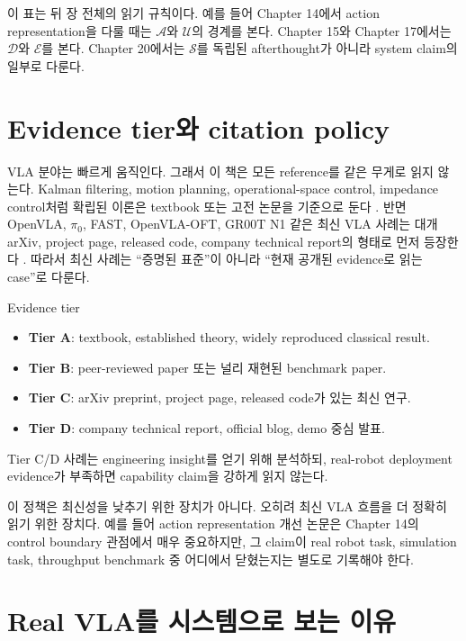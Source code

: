 이 표는 뒤 장 전체의 읽기 규칙이다. 예를 들어 Chapter 14에서 action representation을 다룰 때는 $\mathcal{A}$와 $\mathcal{U}$의 경계를 본다. Chapter 15와 Chapter 17에서는 $\mathcal{D}$와 $\mathcal{E}$를 본다. Chapter 20에서는 $\mathcal{S}$를 독립된 afterthought가 아니라 system claim의 일부로 다룬다.

\section{Evidence tier와 citation policy}

VLA 분야는 빠르게 움직인다. 그래서 이 책은 모든 reference를 같은 무게로 읽지 않는다. Kalman filtering, motion planning, operational-space control, impedance control처럼 확립된 이론은 textbook 또는 고전 논문을 기준으로 둔다 \cite{kalman1960,khatib1987,hogan1985,lavalle2006}. 반면 OpenVLA, $\pi_0$, FAST, OpenVLA-OFT, GR00T N1 같은 최신 VLA 사례는 대개 arXiv, project page, released code, company technical report의 형태로 먼저 등장한다 \cite{openvla2024,pi02024,fast2025,openvlaoft2025,grootn12025}. 따라서 최신 사례는 ``증명된 표준''이 아니라 ``현재 공개된 evidence로 읽는 case''로 다룬다.

\begin{definitionbox}{Evidence tier}
\begin{itemize}
  \item \textbf{Tier A}: textbook, established theory, widely reproduced classical result.
  \item \textbf{Tier B}: peer-reviewed paper 또는 널리 재현된 benchmark paper.
  \item \textbf{Tier C}: arXiv preprint, project page, released code가 있는 최신 연구.
  \item \textbf{Tier D}: company technical report, official blog, demo 중심 발표.
\end{itemize}
Tier C/D 사례는 engineering insight를 얻기 위해 분석하되, real-robot deployment evidence가 부족하면 capability claim을 강하게 읽지 않는다.
\end{definitionbox}

이 정책은 최신성을 낮추기 위한 장치가 아니다. 오히려 최신 VLA 흐름을 더 정확히 읽기 위한 장치다. 예를 들어 action representation 개선 논문은 Chapter 14의 control boundary 관점에서 매우 중요하지만, 그 claim이 real robot task, simulation task, throughput benchmark 중 어디에서 닫혔는지는 별도로 기록해야 한다.

\section{Real VLA를 시스템으로 보는 이유}

